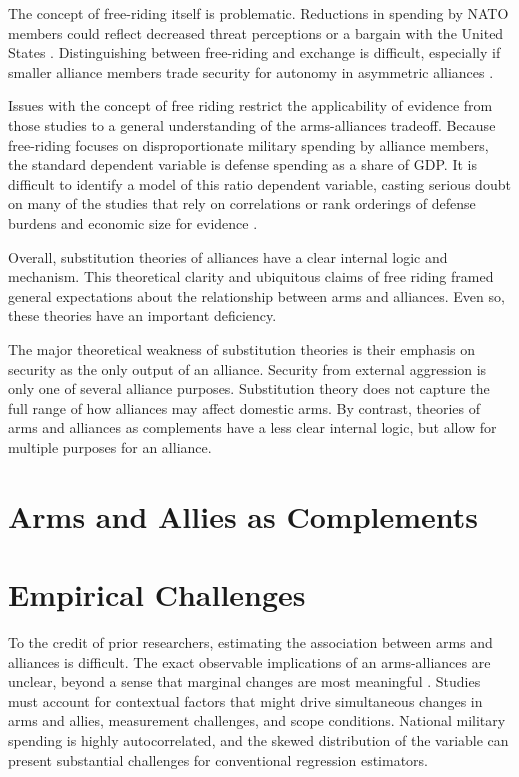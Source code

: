 \documentclass[12pt]{article}
\begin{document}
The concept of free-riding itself is problematic. Reductions in spending by NATO members could reflect decreased threat perceptions or a bargain with the United States \citep{Lanoszka2015}. Distinguishing between free-riding and exchange is difficult, especially if smaller alliance members trade security for autonomy in asymmetric alliances \citep{Morrow1991}. 

Issues with the concept of free riding restrict the applicability of evidence from those studies to a general understanding of the arms-alliances tradeoff. Because free-riding focuses on disproportionate military spending by alliance members, the standard dependent variable is defense spending as a share of GDP. It is difficult to identify a model of this ratio dependent variable, casting serious doubt on many of the studies that rely on correlations or rank orderings of defense burdens and economic size for evidence \citep{PluemperNeumayer2015}. 

Overall, substitution theories of alliances have a clear internal logic and mechanism. This theoretical clarity and ubiquitous claims of free riding framed general expectations about the relationship between arms and alliances. Even so, these theories have an important deficiency. 

The major theoretical weakness of substitution theories is their emphasis on security as the only output of an alliance. Security from external aggression is only one of several alliance purposes. Substitution theory does not capture the full range of how alliances may affect domestic arms. By contrast, theories of arms and alliances as complements have a less clear internal logic, but allow for multiple purposes for an alliance. 



\section*{Arms and Allies as Complements}





\section*{Empirical Challenges}


To the credit of prior researchers, estimating the association between arms and alliances is difficult. The exact observable implications of an arms-alliances are unclear, beyond a sense that marginal changes are most meaningful \citep{Morrow2000, Starr2000}. Studies must account for contextual factors that might drive simultaneous changes in arms and allies, measurement challenges, and scope conditions. National military spending is highly autocorrelated, and the skewed distribution of the variable can present substantial challenges for conventional regression estimators. 
\end{document}
